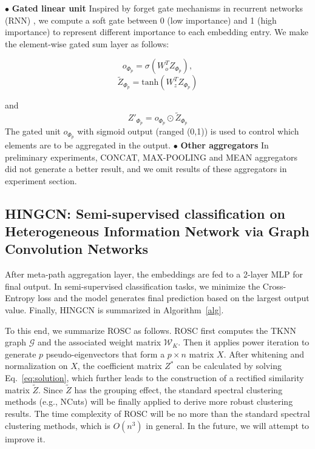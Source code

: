 $\bullet$ \textbf{Gated linear unit}
Inspired by forget gate mechanisms in recurrent networks (RNN) , we compute a soft gate between 0 (low importance) and 1 (high importance) to represent different importance to each embedding entry.
We make the element-wise gated sum layer as follows:
\begin{multicols}{2}
\begin{equation*}
o_{\Phi_p}=\sigma(W_o^T Z_{\Phi_p}),
\end{equation*}\break
\begin{equation*}
\tilde{Z}_{\Phi_p}=\text{tanh}(W_z^T Z_{\Phi_p})
\end{equation*}
\end{multicols}
and 
\begin{equation}
\label{eq:mp_attn}
Z'_{\Phi_p}= o_{\Phi_p}\odot \tilde{Z}_{\Phi_p}
\end{equation}
The gated unit $o_{\Phi_p}$ with sigmoid output (ranged (0,1)) is used to control which elements are to be aggregated in the output.  
$\bullet$ \textbf{Other aggregators}
In preliminary experiments, CONCAT, MAX-POOLING and MEAN aggregators did not generate a better result, and we omit results of these aggregators in experiment section.

\subsection{HINGCN: Semi-supervised classification on Heterogeneous Information Network via Graph Convolution Networks}
After meta-path aggregation layer, the embeddings are fed to a 2-layer MLP for final output. In semi-supervised classification tasks, we minimize the Cross-Entropy loss and the model generates final prediction based on the largest output value.
Finally, HINGCN is summarized in Algorithm~\ref{alg}.

To this end, we summarize ROSC as follows.
ROSC first computes the TKNN graph $\mathcal{G}$
and the associated weight matrix $\mathcal{W}_K$. Then it applies power iteration to generate $p$
pseudo-eigenvectors that form a $p \times n$ matrix $X$.
After whitening and normalization on $X$,
the coefficient matrix $Z^*$ can be calculated by solving Eq.~\ref{eq:solution},
which further leads to the construction of a rectified similarity matrix $\tilde{Z}$.
Since $\tilde{Z}$ has the grouping effect, 
the standard spectral clustering methods (e.g., NCuts) will be finally applied to derive more robust clustering results.
The time complexity of ROSC will be no more than the standard spectral clustering methods,
which is $O(n^3)$ in general.
In the future, we will attempt to improve it. 


